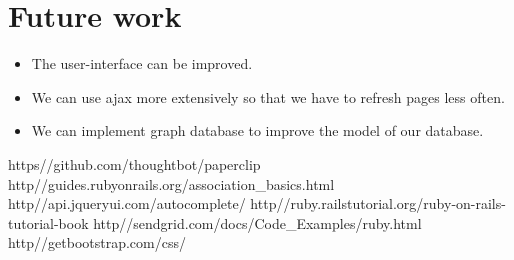 \documentclass{article}
\begin{document}
\section{Future work}
\begin{itemize}
\item The user-interface can be improved.
\item We can use ajax more extensively so that we have to refresh pages less often. 
\item We can implement graph database to improve the model of our database.
\end{itemize}
\begin{thebibliography}{99} 
  https\://github.com/thoughtbot/paperclip
  http\://guides.rubyonrails.org/association\_basics.html 
  http\://api.jqueryui.com/autocomplete/ 
  http\://ruby.railstutorial.org/ruby-on-rails-tutorial-book
 http\://sendgrid.com/docs/Code\_Examples/ruby.html
 http\://getbootstrap.com/css/
 \end{thebibliography}
\end{document}
